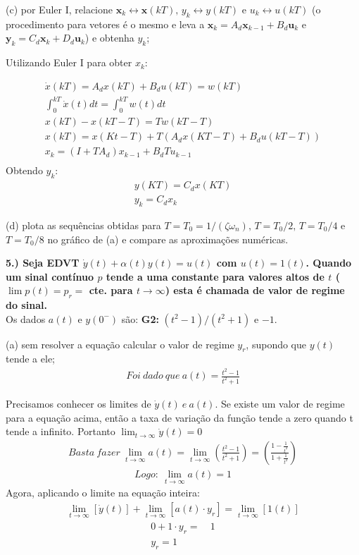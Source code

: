 \documentclass[10pt]{article}
\newcommand{\bm}[1]{\boldsymbol{#1}}
\begin{document}
(c) por Euler I, relacione $\bm{x}_k \leftrightarrow \bm{x}(kT), \, y_k \leftrightarrow y(kT)$ e $u_k \leftrightarrow u(kT)$ (o procedimento para vetores é o mesmo e leva a $\bm{x}_k = A_d \bm{x}_{k - 1} + B_d \bm{u}_k$ e $\bm{y}_k = C_d \bm{x}_k + D_d \bm{u}_k$) e obtenha $y_k$;

Utilizando Euler I para obter $x_k$:

\begin{align*}
    \dot{x}(kT) = A_dx(kT) + B_du(kT) = w(kT) \\
    \int_0^{kT}{\dot{x}(t)dt} = \int_0^{kT}{w(t)dt} \\
    x(kT) - x(kT - T) = Tw(kT - T) \\
    x(kT) = x(Kt - T) + T(A_dx(KT - T) + B_du(kT - T)) \\
    x_{k} = (I + TA_d)x_{k-1} + B_dTu_{k-1} \\
\end{align*}
Obtendo $y_k$:
\begin{align*}
    y(KT) = C_dx(KT) \\
    y_k = C_dx_k
\end{align*}

(d) plota as sequências obtidas para $T = T_0 = 1 / (\zeta \omega_n), \, T = T_0/2, \, T = T_0/4$ e $T = T_0/8$ no gráfico de (a) e compare as aproximações numéricas.


\vspace{\baselineskip}

\textbf{5.) Seja EDVT $\dot{y}(t) + \alpha(t)y(t) = u(t)$ com $u(t) = 1(t)$. Quando um sinal contínuo $p$ tende a uma constante para valores altos de $t$ ($\lim p(t) = p_r = $ cte. para $t \to \infty$) esta é chamada de valor de regime do sinal.}\\
Os dados $a(t)$ e $y(0^-)$ são: \textbf{G2: }$(t^2 - 1)/(t^2 + 1)$ e $-1$.

(a) sem resolver a equação calcular o valor de regime $y_r$, supondo que $y(t)$ tende a ele;
\begin{align*}
    Foi\ dado\ que\ a(t) = \frac{t^2-1}{t^2+1} 
\end{align*}

Precisamos conhecer os limites de $ \dot{y}(t)\ e\ a(t) $.
Se existe um valor de regime para a equação acima, então a taxa de variação da função tende a zero
quando t tende a infinito. Portanto $ \lim_{t\to\infty} \dot{y}(t) = 0 $
\begin{align*}
    Basta\ fazer\ \lim_{t\to\infty} a(t) = \lim_{t\to\infty} \left( \frac{t^2-1}{t^2+1} \right) = \left( \frac{1-\frac{1}{t^2}}{1+\frac{1}{t^2}} \right)
\end{align*}
\begin{align*}
    Logo:\ \lim_{t\to\infty} a(t) = 1
\end{align*}
Agora, aplicando o limite na equação inteira:
\begin{align*}
    \lim_{t\to\infty} [\dot{y}(t)] + \lim_{t\to\infty} [a(t) \cdot y_r] = \lim_{t\to\infty} [1(t)]
\end{align*}
\begin{align*}
    0 + 1 \cdot y_r =&\ 1\\
    y_r = 1
\end{align*}
\end{document}
